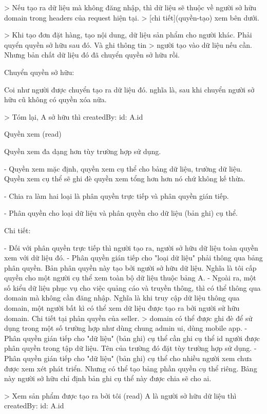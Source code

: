\documentclass{report}
\begin{document}
> Nếu tạo ra dữ liệu mà không đăng nhập, thì dữ liệu sẽ thuộc về người sở hữu domain trong headers của request hiện tại.
> [chi tiết](quyền-tạo) xem bên dưới.

> Khi tạo đơn đặt hàng, tạo nội dung, dữ liệu sản phẩm cho người khác. Phải quyển quyền sở hữu sau đó. Và ghi thông tin
> người tạo vào dữ liệu nếu cần. Nhưng bản chất dữ liệu đó đã chuyển quyền sở hữu rồi.

Chuyển quyền sở hữu:

Coi như người được chuyển tạo ra dữ liệu đó. nghĩa là, sau khi chuyển người sở hữu cũ không có quyền xóa nữa.

> Tóm lại, A sở hữu thì createdBy: { id: A.id }

Quyền xem (read)

Quyền xem đa dạng hơn tùy trường hợp sử dụng.

-   Quyền xem mặc định, quyền xem cụ thể cho bảng dữ liệu, trường dữ liệu. Quyền xem cụ thể sẽ ghi đè quyền xem tổng hơn
hơn nó chứ không kế thừa.

-   Chia ra làm hai loại là phân quyền trực tiếp và phân quyền gián tiếp.

-   Phân quyền cho loại dữ liệu và phân quyền cho dữ liệu (bản ghi) cụ thể.

Chi tiết:

-   Đối với phân quyền trực tiếp thì người tạo ra, người sở hữu dữ liệu toàn quyền xem với dữ liệu đó.
-   Phân quyền gián tiếp cho "loại dữ liệu" phải thông qua bảng phân quyền. Bản phân quyền này tạo bởi người sở hữu dữ
liệu. Nghĩa là tôi cấp quyền cho một người cụ thể xem toàn bộ dữ liệu thuộc bảng A.
-   Ngoài ra, một số kiểu dữ liệu phục vụ cho việc quảng cáo và truyền thông, thì có thể thông qua domain mà không cần
đăng nhập. Nghĩa là khi truy cập dữ liệu thông qua domain, một người bất kì có thể xem dữ liệu được tạo ra bởi người
sử hữu domain. Chi tiết tại phân quyền của seller.
> domain có thể được ghi đè để sử dụng trong một số trường hợp như dùng chung admin ui, dùng mobile app.
-   Phân quyền gián tiếp cho "dữ liệu" (bản ghi) cụ thể cần ghi cụ thể id người được phân quyền trong tập dữ liệu. Tên
của trường đó đặt tùy trường hợp sử dụng.
-   Phân quyền gián tiếp cho "dữ liệu" (bản ghi) cụ thể cho nhiều người xem chưa được xem xét phát triển. Nhưng có thể
tạo bảng phần quyền cụ thể riêng. Bảng này người sở hữu chỉ định bản ghi cụ thể này được chia sẽ cho ai.

> Xem sản phẩm được tạo ra bởi tôi (read) A là người sở hữu dữ liệu thì createdBy: { id: A.id }
\end{document}
